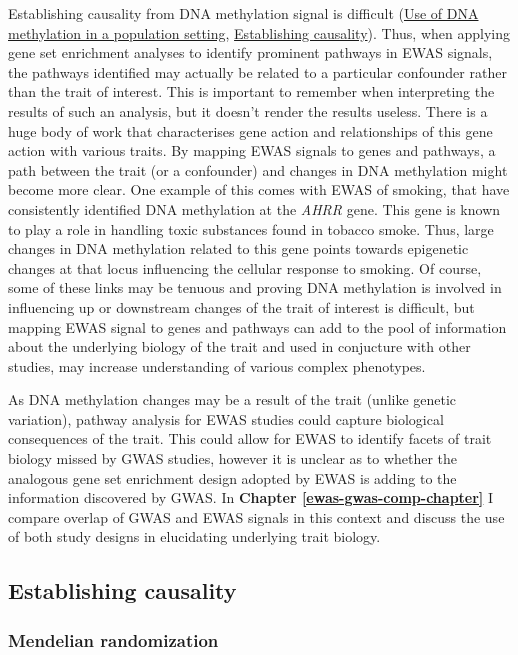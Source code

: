 \documentclass[11pt,twoside]{bristolthesis}
\begin{document}
Establishing causality from DNA methylation signal is difficult (\protect\hyperlink{dnam-phs}{Use of DNA methylation in a population setting}, \protect\hyperlink{establishing-causality}{Establishing causality}). Thus, when applying gene set enrichment analyses to identify prominent pathways in EWAS signals, the pathways identified may actually be related to a particular confounder rather than the trait of interest. This is important to remember when interpreting the results of such an analysis, but it doesn't render the results useless. There is a huge body of work that characterises gene action and relationships of this gene action with various traits. By mapping EWAS signals to genes and pathways, a path between the trait (or a confounder) and changes in DNA methylation might become more clear. One example of this comes with EWAS of smoking, that have consistently identified DNA methylation at the \emph{AHRR} gene. This gene is known to play a role in handling toxic substances found in tobacco smoke. Thus, large changes in DNA methylation related to this gene points towards epigenetic changes at that locus influencing the cellular response to smoking. Of course, some of these links may be tenuous and proving DNA methylation is involved in influencing up or downstream changes of the trait of interest is difficult, but mapping EWAS signal to genes and pathways can add to the pool of information about the underlying biology of the trait and used in conjucture with other studies, may increase understanding of various complex phenotypes.

As DNA methylation changes may be a result of the trait (unlike genetic variation), pathway analysis for EWAS studies could capture biological consequences of the trait. This could allow for EWAS to identify facets of trait biology missed by GWAS studies, however it is unclear as to whether the analogous gene set enrichment design adopted by EWAS is adding to the information discovered by GWAS. In \textbf{Chapter \ref{ewas-gwas-comp-chapter}} I compare overlap of GWAS and EWAS signals in this context and discuss the use of both study designs in elucidating underlying trait biology.

\hypertarget{establishing-causality}{%
\subsection{Establishing causality}\label{establishing-causality}}

\hypertarget{mendelian-randomization}{%
\subsubsection{Mendelian randomization}\label{mendelian-randomization}}
\end{document}
